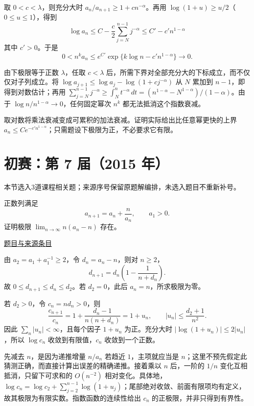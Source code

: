 \documentclass[UTF8,12pt,a4paper,fontset=fandol]{ctexart}
\begin{document}
\begin{solve}\label{ans:pre06-math:6}

取 $0<c<\lambda$，则充分大时 $a_n/a_{n+1}\ge1+cn^{-\alpha}$。再用 $\log(1+u)\ge u/2$（$0\le u\le1$），得到
\[
\log a_n\le C-\frac c2\sum_{j=N}^{n-1}j^{-\alpha}
\le C'-c'n^{1-\alpha}
\]
其中 $c'>0$。于是
\[
0<n^ka_n\le e^{C'}\exp\{k\log n-c'n^{1-\alpha}\}\longrightarrow0.
\]

由下极限等于正数 $\lambda$，任取 $c<\lambda$ 后，所需下界对全部充分大的下标成立，而不仅仅对子列成立。将 $\log a_{j+1}\le\log a_j-\log(1+cj^{-\alpha})$ 从 $N$ 累加到 $n-1$，即得到对数估计；再用 $\sum_{j=N}^{n-1}j^{-\alpha}\ge\int_N^n t^{-\alpha}\,dt=(n^{1-\alpha}-N^{1-\alpha})/(1-\alpha)$。由于 $\log n/n^{1-\alpha}\to0$，任何固定幂次 $n^k$ 都无法抵消这个指数衰减。

\end{solve}

\begin{remark}[方法与条件]取对数将乘法衰减变成可累积的加法衰减。证明实际给出比任意幂更快的上界 $a_n\le C e^{-c'n^{1-\alpha}}$；只需题设下极限为正，不必要求它有限。\end{remark}

\section{初赛：第 7 届（2015 年）}

本节选入3道课程相关题；来源序号保留原题解编排，未选入题目不重新补号。

\begin{example}[来源序号4]\label{ex:pre07-math:4}\label{pr:pre07-math:4}

正数列满足
\[
a_{n+1}=a_n+\frac n{a_n},\qquad a_1>0.
\]
证明极限 $\lim_{n\to\infty}n(a_n-n)$ 存在。

\par\href{https://github.com/lzxcr/cmc-mathematics/blob/64916fa1fdbc3e444a652eca204d5669058ee321/src/problems/preliminary/07/04.md}{题目与来源条目}

\end{example}

\begin{solve}\label{ans:pre07-math:4}

由 $a_2=a_1+a_1^{-1}\ge2$，令 $d_n=a_n-n$，则对 $n\ge2$，
\[
d_{n+1}=d_n\left(1-\frac1{n+d_n}\right).
\]
故 $0\le d_{n+1}\le d_n\le d_2$。若 $d_2=0$，此后 $a_n=n$，所求极限为零。

若 $d_2>0$，令 $c_n=nd_n>0$，则
\[
\frac{c_{n+1}}{c_n}
=1+\frac{d_n-1}{n(n+d_n)}=1+u_n,
\qquad |u_n|\le\frac{d_2+1}{n^2}.
\]
因此 $\sum_n|u_n|<\infty$，且每个因子 $1+u_n$ 为正。充分大时 $|\log(1+u_n)|\le2|u_n|$，所以 $\log c_n$ 收敛到有限值，$c_n$ 收敛到一个正数。

先减去 $n$，是因为递推增量 $n/a_n$ 若趋近 $1$，主项就应当是 $n$；这里不预先假定此猜测正确，而直接计算出误差的精确递推。接着乘以 $n$ 后，一阶的 $1/n$ 变化互相抵消，只留下可求和的 $O(n^{-2})$ 相对变化。具体地，$\log c_n=\log c_2+\sum_{j=2}^{n-1}\log(1+u_j)$；尾部绝对收敛、前面有限项均有定义，故其极限为有限实数。指数函数的连续性给出 $c_n$ 的正极限，并非只得到有界性。

\end{solve}
\end{document}
